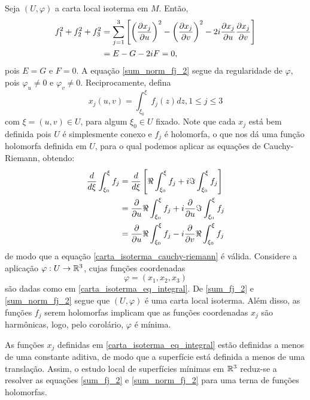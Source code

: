 \begin{demonstracao}
	Seja $(U, \varphi)$ a carta local isoterma em $M$. Então,
	\begin{align*}
	f_1^2 + f_2^2 + f_3^2 &= \sum_{j=1}^{3} \left[ \left( \frac{\partial x_j}{\partial u} \right)^2 - \left( \frac{\partial x_j}{\partial v} \right)^2 - 2i \frac{\partial x_j}{\partial u} \frac{\partial x_j}{\partial v} \right]\\
	&= E - G - 2iF = 0,
	\end{align*}
	pois $E=G$ e $F=0$. A equação \eqref{sum_norm_fj_2} segue da regularidade de $\varphi$, pois $\varphi_u \neq 0$ e $\varphi_v \neq 0$.
	Reciprocamente, defina
	\begin{equation}\label{carta_isoterma_eq_integral}
	x_j(u,v) = \int_{\xi_0}^{\xi} f_j(z) dz, 1 \leq j \leq 3
	\end{equation}
	com $\xi = (u,v) \in U$, para algum $\xi_0 \in U$ fixado. Note que cada $x_j$ está bem definida pois $U$ é simplesmente conexo e $f_j$ é holomorfa, o que nos dá uma função holomorfa definida em $U$, para o qual podemos aplicar as equações de Cauchy-Riemann, obtendo:
	\begin{align*}
	\frac{d}{d \xi} \int_{\xi_0}^{\xi} f_j &= \frac{d}{d \xi} \left[ \Re \int_{\xi_0}^{\xi} f_j + i \Im \int_{\xi_0}^{\xi} f_j \right]\\
	&= \frac{\partial}{\partial u} \Re \int_{\xi_0}^{\xi} f_j + i \frac{\partial}{\partial u} \Im \int_{\xi_0}^{\xi} f_j\\
	&= \frac{\partial}{\partial u} \Re \int_{\xi_0}^{\xi} f_j - i \frac{\partial}{\partial v} \Re \int_{\xi_0}^{\xi} f_j
	\end{align*}
	de modo que a equação \eqref{carta_isoterma_cauchy-riemann} é válida. Considere a aplicação $\varphi: U \rightarrow \mathbb{R}^3$, cujas funções coordenadas
	\begin{equation*}
	\varphi = (x_1,x_2,x_3)
	\end{equation*}
	são dadas como em \eqref{carta_isoterma_eq_integral}. De \eqref{sum_fj_2} e \eqref{sum_norm_fj_2} segue que $(U,\varphi)$ é uma carta local isoterma. Além disso, as funções $f_j$ serem holomorfas implicam que as funções coordenadas $x_j$ são harmônicas, logo, pelo corolário, $\varphi$ é mínima.
\end{demonstracao}

\begin{observacao}
	As funções $x_j$ definidas em \eqref{carta_isoterma_eq_integral} estão definidas a menos de uma constante aditiva, de modo que a superfície está definida a menos de uma translação. Assim, o estudo local de superfícies mínimas em $\mathbb{R}^3$ reduz-se a resolver as equações \eqref{sum_fj_2} e \ref*{sum_norm_fj_2} para uma terna de funções holomorfas.
\end{observacao}

